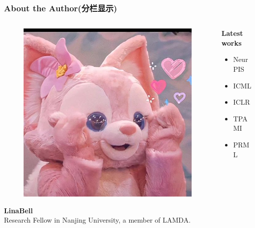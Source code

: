 \documentclass[aspectratio=169]{beamer}%
\begin{document}
{\begin{frame}
	\frametitle{About the Author(分栏显示)}
    \begin{columns}
        \begin{column}{0.37\linewidth}
            \begin{figure}
                {\includegraphics[scale=0.16]{figs/profile.jpg}}
            \end{figure}
            {\scriptsize
             {\textbf{LinaBell}}\\Research Fellow in Nanjing University, a member of LAMDA. 
             }
        \end{column}
        \begin{column}{0.65\linewidth}
        \textbf{Latest works}
        \begin{itemize}
            \item NeurPIS
            \item ICML
            \item ICLR
            \item TPAMI
            \item PRML
        \end{itemize}
      \end{column}
  \end{columns}
\end{frame}

}
\end{document}
